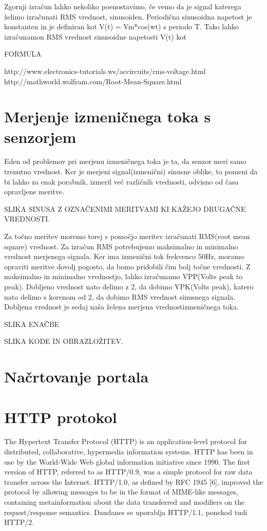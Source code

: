 \documentclass[12pt,a4paper,titlepage,openany]{report}
\begin{document}
Zgornji izračun lahko nekoliko poenostavimo, če vemo da je signal katerega želimo izračunati RMS vrednost, sinusoiden.
Periodična sinusoidna napetost je konstanten in je definiran kot V(t) = Vm*cos(wt) s periodo T. Tako lahko izračunamon RMS
vrednost sinusoidne napetosti V(t) kot

FORMULA

http://www.electronics-tutorials.ws/accircuits/rms-voltage.html
http://mathworld.wolfram.com/Root-Mean-Square.html


\section{Merjenje izmeničnega toka s senzorjem}
Eden od problemov pri merjenu izmeničnega toka je ta, da senzor meri samo trenutno vrednost. Ker je merjeni signal(izmenični) sinusne oblike, to pomeni da bi lahko za enak porabnik, izmeril več različnih vrednosti, odvisno od časa opravljene meritve.

SLIKA SINUSA Z OZNAČENIMI MERITVAMI KI KAŽEJO DRUGAČNE VREDNOSTI.

Za točno meritev moremo torej s pomočjo meritev izračunati RMS(root mean square) vrednost. Za izračun RMS potrebujemo maksimalno in minimalno vrednost merjenega signala. Ker ima izmenični tok frekvenco 50Hz, moramo opraviti meritve dovolj pogosto, da bomo pridobili čim bolj točne vrednosti. Z maksimalno in minimalno vrednostjo, lahko izračunamo VPP(Volts peak to peak). Dobljeno vrednost nato delimo z 2, da dobimo VPK(Volts peak), katero nato delimo s korenom od 2, da dobimo RMS vrednost sinusnega signala. Dobljena vrednost je sedaj naša želena merjena vrednostizmeničnega toka.

SLIKA ENAČBE

SLIKA KODE IN OBRAZLOŽITEV.


\section{Načrtovanje portala}
\thispagestyle{fancy}

\section{HTTP protokol}
The Hypertext Transfer Protocol (HTTP) is an application-level
   protocol for distributed, collaborative, hypermedia information
   systems. HTTP has been in use by the World-Wide Web global
   information initiative since 1990. The first version of HTTP,
   referred to as HTTP/0.9, was a simple protocol for raw data transfer
   across the Internet. HTTP/1.0, as defined by RFC 1945 [6], improved
   the protocol by allowing messages to be in the format of MIME-like
   messages, containing metainformation about the data transferred and
   modifiers on the request/response semantics. Dandanes se uporablja
   HTTP/1.1, ponekod tudi HTTP/2. 
\end{document}
